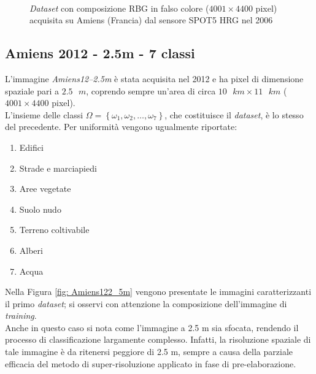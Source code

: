 \clearpage

\begin{figure}[!ht]
   \center
   \\%
     \hspace{4mm}
    \caption{\emph{Dataset} con composizione RBG in falso colore ($4001\times4400$ pixel) acquisita su Amiens (Francia) dal sensore \textsc{SPOT5 HRG} nel 2006}
    \label{fig: Amiens62_5m}
  \end{figure}
\clearpage


\subsection{Amiens 2012 - 2.5m - 7 classi}
L'immagine \emph{Amiens12--2.5m} è stata acquisita nel 2012 e ha pixel di dimensione spaziale pari a $2.5\text{ }m$, coprendo sempre un'area di circa $10\text{ }km\times11\text{ }km$ ($4001\times4400$ pixel).\\
L'insieme delle classi $\Omega=\left\lbrace\omega_1,\omega_2,\ldots,\omega_{7}\right\rbrace$, che costituisce il \emph{dataset}, è lo stesso del precedente. Per uniformità vengono ugualmente riportate:
\begin{enumerate}
\item Edifici
\item Strade e marciapiedi
\item Aree vegetate
\item Suolo nudo
\item Terreno coltivabile
\item Alberi
\item Acqua
\end{enumerate}
Nella Figura \ref{fig: Amiens122_5m} vengono presentate le immagini caratterizzanti il primo \emph{dataset}; si osservi con attenzione la composizione dell'immagine di \emph{training}.\\
Anche in questo caso si nota come l'immagine a 2.5 m sia sfocata, rendendo il processo di classificazione largamente complesso. Infatti, la risoluzione spaziale di tale immagine è da ritenersi peggiore di 2.5 m, sempre a causa della parziale efficacia del metodo di super-risoluzione applicato in fase di pre-elaborazione.


